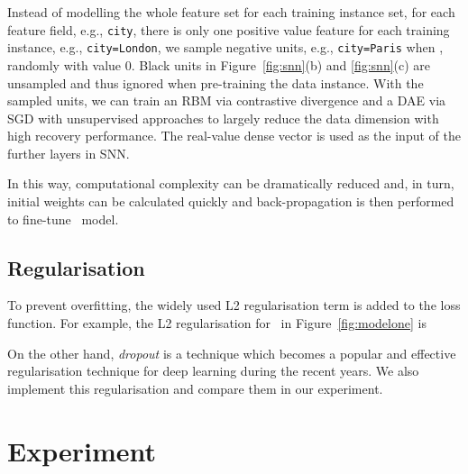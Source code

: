 \documentclass{llncs}
\newcommand{\ft}{\texttt}
\newcommand{\fmnn}{\text{FNN}}
\newcommand{\snn}{\text{SNN}}
\begin{document}
Instead of modelling the whole feature set for each training instance set, for each feature field, e.g., \ft{city}, there is only one positive value feature for each training instance, e.g., \ft{city=London}, we sample  negative units, e.g., \ft{city=Paris} when , randomly with value 0. Black units in Figure~\ref{fig:snn}(b) and \ref{fig:snn}(c) are unsampled and thus ignored when pre-training the data instance. With the sampled units, we can train an RBM via contrastive divergence \cite{hinton2002training} and a DAE via SGD with unsupervised approaches to largely reduce the data dimension with high recovery performance. The real-value dense vector is used as the input of the further layers in SNN.









In this way, computational complexity can be dramatically reduced and, in turn, initial weights can be calculated quickly and back-propagation is then performed to fine-tune \snn~model.


\subsection{Regularisation}\vspace{-2pt}
To prevent overfitting, the widely used L2 regularisation term is added to the loss function. For example, the L2 regularisation for \fmnn~in Figure~\ref{fig:modelone} is

On the other hand, \emph{dropout} \cite{srivastava2014dropout} is a technique which becomes a popular and effective regularisation technique for deep learning during the recent years. We also implement this regularisation and compare them in our experiment.

\vspace{-5pt}
\section{Experiment}\label{sec:exp}
\vspace{-3pt}
\end{document}
